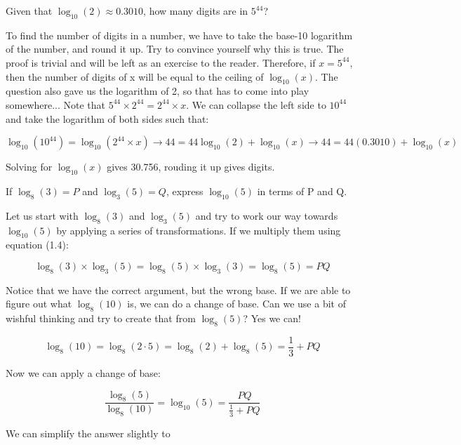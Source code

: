 \begin{question}

Given that $\log_{10}(2) \approx 0.3010$, how many digits are in $5^44$?

\end{question}

\begin{solution}

To find the number of digits in a number, we have to take the base-10 logarithm of the number, and round it up. Try to convince yourself why this is true. The proof is trivial and will be left as an exercise to the reader.
\newline\newline
Therefore, if $x = 5^{44}$, then the number of digits of x will be equal to the ceiling of $\log_{10}(x)$. The question also gave us the logarithm of 2, so that has to come into play somewhere... Note that  $5^{44} \times 2^{44} = 2^{44} \times x$. We can collapse the left side to $10^{44}$ and take the logarithm of both sides such that:

$$
  \log_{10}(10^{44}) = \log_{10}(2^{44} \times x) \rightarrow
  44 = 44\log_{10}(2) + \log_{10}(x) \rightarrow
  44 = 44(0.3010) + \log_{10}(x)
$$

Solving for $\log_{10}(x)$ gives 30.756, rouding it up gives  digits.
\end{solution}

\begin{question}

If $\log_8(3) = P$ and $\log_3(5) = Q$, express $\log_{10}(5)$ in terms of P and Q.

\end{question}

\begin{solution}

Let us start with $\log_8(3)$ and $\log_3(5)$ and try to work our way towards $\log_{10}(5)$ by applying a series of transformations. If we multiply them using equation (1.4):

$$
   \log_8(3) \times \log_3(5) = \log_8(5) \times \log_3(3) = \log_8(5) = PQ
$$

Notice that we have the correct argument, but the wrong base. If we are able to figure out what $\log_8(10)$ is, we can do a change of base. Can we use a bit of wishful thinking and try to create that from $\log_8(5)$? Yes we can!

$$
   \log_8(10) = \log_8(2 \cdot 5) = \log_8(2) + \log_8(5) = \frac{1}{3} + PQ
$$

Now we can apply a change of base:

$$
   \frac{\log_8(5)}{\log_8(10)} = \log_{10}(5) = \frac{PQ}{\frac{1}{3}+PQ}
$$

We can simplify the answer slightly to 

\end{solution}

